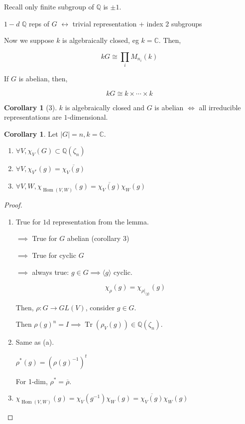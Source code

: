 \documentclass{article}
\theoremstyle{definition}
\newtheorem{corollary}[theorem]{Corollary}
\newcommand{\Hom}{\operatorname{Hom}}
\newcommand{\Tr}{\operatorname{Tr}}
\begin{document}
Recall only finite subgroup of \(\mathbb{Q}\) is \(\pm 1\).

\(1-d\) \(\mathbb{Q}\) reps of \(G\) \(\leftrightarrow\) trivial representation + index \(2\) subgroups

Now we suppose \(k\) is algebraically closed, eg \(k = \mathbb{C}\). Then,

\[
    kG \cong \prod_i M_{n_i}(k)
\]

If \(G\) is abelian, then,

\[
    kG \cong k \times \cdots \times k
\]

\begin{corollary}
    [3] \(k\) is algebraically closed and \(G\) is abelian \(\iff\) all irreducible representations are \(1\)-dimensional. 
\end{corollary}

\begin{corollary}
    Let \(\vert G \vert = n, k = \mathbb{C}\). 

    \begin{enumerate}[label=\alph*)]
        \item \(\forall V, \chi_V(G) \subset \mathbb{Q} (\zeta_n)\) 
        \item \(\forall V, \chi_{V^{\ast}}(g) = \overline{\chi_V(g)} \)
        \item \(\forall V, W, \chi_{\Hom(V,W)} (g) = \overline{\chi_V(g)} \chi_W(g)\)   
    \end{enumerate} 
\end{corollary}

\begin{proof}
    \begin{enumerate}[label=\alph*)]
        \item True for \(1\)d representation from the lemma.
        
        \(\implies\) True for \(G\) abelian (corollary 3)

        \(\implies\) True for cyclic \(G\)

        \(\implies\) always true: \(g\in G \implies \langle g \rangle \) cyclic.

        \[
            \chi_{\rho}(g) = \chi_{\rho|_{\langle g \rangle }} (g) 
        \]

        Then, \(\rho : G \to GL(V)\), consider \(g\in G\).
        
        Then \(\rho(g)^n = I \implies \Tr(\rho_V(g)) \in \mathbb{Q}(\zeta_n)\).
        
        \item Same as (a). 
        
        \(\rho ^{\ast} (g) = (\rho (g)^{-1})^t\) 
        
        For 1-dim, \(\rho ^{\ast} = \overline{\rho}\).

        \item \(\chi_{\Hom(V,W)}(g) = \chi_V(g ^{-1}) \chi_W(g) = \overline{\chi_V(g)} \chi_W(g)\) 
    \end{enumerate} 
\end{proof}
\end{document}
